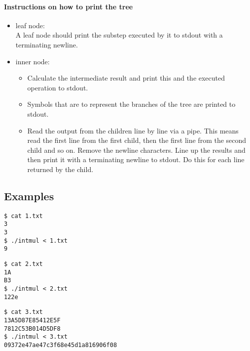 \paragraph{Instructions on how to print the tree}
\begin{itemize}
	\item leaf node: \\
	A leaf node should print the substep executed by it to stdout with a terminating newline.
	\item inner node: 
	\begin{itemize}
		\item Calculate the intermediate result and print this and the executed operation to stdout. 
		\item Symbols that are to represent the branches of the tree are printed to stdout.
		\item Read the output from the children line by line via a pipe. This means read the first line from the first child, then the first line from the second child and so on. Remove the newline characters. Line up the results and then print it with a terminating newline to stdout. Do this for each line returned by the child.
	\end{itemize}
\end{itemize}
\subsection*{Examples}
\begin{multicols}{3}
\begin{verbatim}
$ cat 1.txt
3
3
$ ./intmul < 1.txt
9
\end{verbatim}

\begin{verbatim}
$ cat 2.txt
1A
B3
$ ./intmul < 2.txt
122e
\end{verbatim}

\begin{verbatim}
$ cat 3.txt
13A5D87E85412E5F
7812C53B014D5DF8
$ ./intmul < 3.txt
09372e47ae47c3f68e45d1a816906f08
\end{verbatim}
\end{multicols}

\osueguidelinestwo


